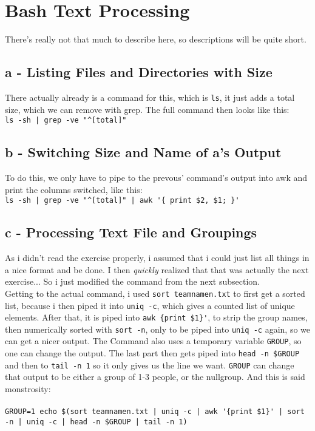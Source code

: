 \documentclass[a4paper, 11pt]{article}
\begin{document}
    \section{Bash Text Processing}
    There's really not that much to describe here, so descriptions will be quite short.
    
    \subsection{a - Listing Files and Directories with Size}
    There actually already is a command for this, which is \texttt{ls}, it just adds a total size, which we can 
    remove with grep. The full command then looks like this:\\ 
    \lstinline{ls -sh | grep -ve "^[total]"}

    \subsection{b - Switching Size and Name of a's Output}
    To do this, we only have to pipe to the prevous' command's output into awk and print the columns switched, 
    like this:\\
    \lstinline+ls -sh | grep -ve "^[total]" | awk '{ print $2, $1; }'+

    \subsection{c - Processing Text File and Groupings}
    As i didn't read the exercise properly, i assumed that i could just list all things in a nice format and be done. 
    I then \textit{quickly} realized that that was actually the next exercise... So i just modified the command from the next subsection.\\
    Getting to the actual command, i used \lstinline{sort teamnamen.txt} to first get a sorted list, because i then piped it 
    into \lstinline{uniq -c}, which gives a counted list of unique elements. After that, it is piped into \lstinline+awk {print $1}'+, 
    to strip the group names, then numerically sorted with \lstinline{sort -n}, only to be piped into \lstinline{uniq -c} again, so we can get a nicer output.
    The Command also uses a temporary variable \lstinline{GROUP}, so one can change the output. The last part then gets piped into 
    \lstinline{head -n $GROUP} and then to \lstinline{tail -n 1} so it only gives us the line we want. \texttt{GROUP} can change that output to be either a group 
    of 1-3 people, or the nullgroup. And this is said monstrosity:
    \\\\
    \lstinline+GROUP=1 echo $(sort teamnamen.txt | uniq -c | awk '{print $1}' | sort -n | uniq -c | head -n $GROUP | tail -n 1)+ 
\end{document}
